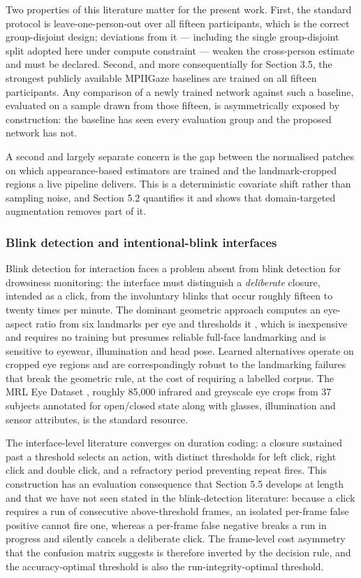 Two properties of this literature matter for the present work. First, the standard protocol is leave-one-person-out over all fifteen participants, which is the correct group-disjoint design; deviations from it --- including the single group-disjoint split adopted here under compute constraint --- weaken the cross-person estimate and must be declared. Second, and more consequentially for Section 3.5, the strongest publicly available MPIIGaze baselines are trained on all fifteen participants. Any comparison of a newly trained network against such a baseline, evaluated on a sample drawn from those fifteen, is asymmetrically exposed by construction: the baseline has seen every evaluation group and the proposed network has not.

A second and largely separate concern is the gap between the normalised patches on which appearance-based estimators are trained and the landmark-cropped regions a live pipeline delivers. This is a deterministic covariate shift rather than sampling noise, and Section 5.2 quantifies it and shows that domain-targeted augmentation removes part of it.

\subsubsection{Blink detection and intentional-blink interfaces}

Blink detection for interaction faces a problem absent from blink detection for drowsiness monitoring: the interface must distinguish a \emph{deliberate} closure, intended as a click, from the involuntary blinks that occur roughly fifteen to twenty times per minute. The dominant geometric approach computes an eye-aspect ratio from six landmarks per eye and thresholds it , which is inexpensive and requires no training but presumes reliable full-face landmarking and is sensitive to eyewear, illumination and head pose. Learned alternatives operate on cropped eye regions and are correspondingly robust to the landmarking failures that break the geometric rule, at the cost of requiring a labelled corpus. The MRL Eye Dataset , roughly 85,000 infrared and greyscale eye crops from 37 subjects annotated for open/closed state along with glasses, illumination and sensor attributes, is the standard resource.

The interface-level literature converges on duration coding: a closure sustained past a threshold selects an action, with distinct thresholds for left click, right click and double click, and a refractory period preventing repeat fires. This construction has an evaluation consequence that Section 5.5 develops at length and that we have not seen stated in the blink-detection literature: because a click requires a run of consecutive above-threshold frames, an isolated per-frame false positive cannot fire one, whereas a per-frame false negative breaks a run in progress and silently cancels a deliberate click. The frame-level cost asymmetry that the confusion matrix suggests is therefore inverted by the decision rule, and the accuracy-optimal threshold is also the run-integrity-optimal threshold.

